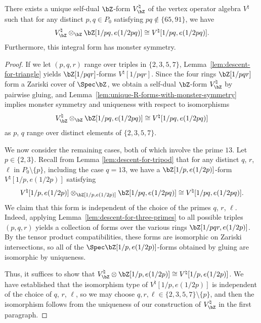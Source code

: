 \begin{thm} \label{thm:integral-form-for-moonshine}There exists a unique self-dual $\bZ$-form $V^\natural_{\bZ}$ of the vertex operator algebra $V^\natural$ such that for any distinct $p,q \in P_0$ satisfying $pq \not\in \{65, 91\}$, we have
\begin{gather*} V^\natural_{\bZ} \otimes_{\bZ} \bZ[1/pq, e(1/2pq)] \cong V^\natural[1/pq, e(1/2pq)]. \end{gather*}
Furthermore, this integral form has monster symmetry.
\end{thm}
\begin{proof}If we let $(p,q,r)$ range over triples in $\{2,3,5,7\}$, Lemma~\ref{lem:descent-for-triangle} yields $\bZ[1/pqr]$-forms $V^\natural[1/pqr]$. Since the four rings $\bZ[1/pqr]$ form a Zariski cover of $\Spec \bZ$, we obtain a self-dual $\bZ$-form $V^\natural_\bZ$ by pairwise gluing, and Lemma~\ref{lem:unique-R-forms-with-monster-symmetry} implies monster symmetry and uniqueness with respect to isomorphisms
\begin{gather*} V^\natural_{\bZ} \otimes_{\bZ} \bZ[1/pq, e(1/2pq)] \cong V^\natural[1/pq, e(1/2pq)] \end{gather*}
as $p$, $q$ range over distinct elements of $\{2,3,5,7\}$.

We now consider the remaining cases, both of which involve the prime $13$. Let $p \in \{2,3\}$. Recall from Lemma \ref{lem:descent-for-tripod} that for any distinct $q$, $r$, $\ell$ in $P_0 \setminus \{p\}$, including the case $q=13$, we have a $\bZ[1/p,e(1/2p)]$-form $V^\natural[1/p, e(1/2p)]$ satisfying
\begin{gather*} V^\natural[1/p, e(1/2p)] \otimes_{\bZ[1/p, e(1/2p)]} \bZ[1/pq, e(1/2pq)] \cong V^\natural[1/pq, e(1/2pq)]. \end{gather*}
We claim that this form is independent of the choice of the primes $q$, $r$, $\ell$. Indeed, ap\-plying Lemma~\ref{lem:descent-for-three-primes} to all possible triples $(p,q,r)$ yields a collection of forms over the various rings $\bZ[1/pqr, e(1/2p)]$. By the tensor product compatibilities, these forms are isomorphic on Zariski intersections, so all of the $\Spec \bZ[1/p,e(1/2p)]$-forms obtained by gluing are isomorphic by uniqueness.

Thus, it suffices to show that $V^\natural_{\bZ} \otimes \bZ[1/p, e(1/2p)] \cong V^\natural[1/p, e(1/2p)]$. We have established that the isomorphism type of $V^\natural[1/p, e(1/2p)]$ is independent of the choice of $q$, $r$, $\ell$, so we may choose $q,r,\ell \in \{2,3,5,7\} \setminus \{p\}$, and then the isomorphism follows from the uniqueness of our construction of $V^\natural_{\bZ}$ in the first paragraph.
\end{proof}
